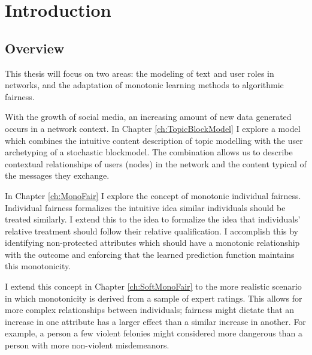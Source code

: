 \chapter{Introduction}

\section{Overview}

This thesis will focus on two areas: the modeling of text and user roles in networks, and the adaptation of monotonic learning methods to algorithmic fairness.

With the growth of social media, an increasing amount of new data generated occurs in a network context.  In Chapter \ref{ch:TopicBlockModel} I explore a model which combines the intuitive content description of topic modelling with the user archetyping of a stochastic blockmodel.  The combination allows us to describe contextual relationships of users (nodes) in the network and the content typical of the messages they exchange.

In Chapter \ref{ch:MonoFair} I explore the concept of monotonic individual fairness.  Individual fairness \citep{dwork2012fairness} formalizes the intuitive idea similar individuals should be treated similarly.  I extend this to the idea to formalize the idea that individuals' relative treatment should follow their relative qualification.  I accomplish this by identifying non-protected attributes which should have a monotonic relationship with the outcome and enforcing that the learned prediction function maintains this monotonicity.

I extend this concept in Chapter \ref{ch:SoftMonoFair} to the more realistic scenario in which monotonicity is derived from a sample of expert ratings.  This allows for more complex relationships between individuals; fairness might dictate that an increase in one attribute has a larger effect than a similar increase in another.  For example, a person a few violent felonies might considered more dangerous than a person with more non-violent misdemeanors.